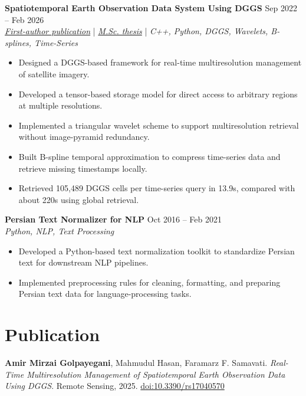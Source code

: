 \documentclass[a4paper,10pt]{article}
\begin{document}
\noindent
\textbf{Spatiotemporal Earth Observation Data System Using DGGS} \hfill Sep 2022 -- Feb 2026 \\
\textit{\href{https://doi.org/10.3390/rs17040570}{First-author publication}} | \textit{\href{https://ucalgary.scholaris.ca/items/114b394b-e516-4732-bd3a-45dd6160d480}{M.Sc. thesis}} | \textit{C++, Python, DGGS, Wavelets, B-splines, Time-Series}
\begin{itemize}[leftmargin=0.25in]
    \item Designed a DGGS-based framework for real-time multiresolution management of satellite imagery.
    \item Developed a tensor-based storage model for direct access to arbitrary regions at multiple resolutions.
    \item Implemented a triangular wavelet scheme to support multiresolution retrieval without image-pyramid redundancy.
    \item Built B-spline temporal approximation to compress time-series data and retrieve missing timestamps locally.
    \item Retrieved 105,489 DGGS cells per time-series query in 13.9s, compared with about 220s using global retrieval.
\end{itemize}

\noindent
\textbf{Persian Text Normalizer for NLP} \hfill Oct 2016 -- Feb 2021 \\
\textit{Python, NLP, Text Processing}
\begin{itemize}[leftmargin=0.25in]
    \item Developed a Python-based text normalization toolkit to standardize Persian text for downstream NLP pipelines.
    \item Implemented preprocessing rules for cleaning, formatting, and preparing Persian text data for language-processing tasks.
\end{itemize}

\section*{Publication}

\textbf{Amir Mirzai Golpayegani}, Mahmudul Hasan, Faramarz F. Samavati. 
\textit{Real-Time Multiresolution Management of Spatiotemporal Earth Observation Data Using DGGS}. 
Remote Sensing, 2025. \href{https://doi.org/10.3390/rs17040570}{doi:10.3390/rs17040570}

\end{document}
